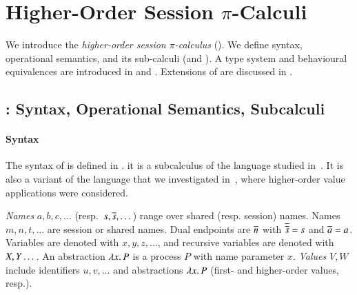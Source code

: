 \documentclass[runningheads]{llncs}
\begin{document}
%

\section{Higher-Order Session $\pi$-Calculi}
\label{sec:calculus}

We introduce 
the \emph{higher-order session $\pi$-calculus} (\HOp).
We define 
syntax, operational semantics, and 
its sub-calculi (\sessp and \HO).
A type system and behavioural equivalences are introduced in 
 and . 
Extensions of \HOp %
are discussed in .




\subsection{\HOp: Syntax, Operational Semantics, Subcalculi}
\label{subsec:syntax}

\paragraph{Syntax}
The syntax of \HOp is defined in .
\HOp it is a subcalculus of the language studied 
in~\cite{tlca07}. It is also a variant of the language that we investigated in~\cite{characteristic_bis}, 
where higher-order value applications were considered. 




\emph{Names} $a,b,c, \dots$ (resp.~$s, \overline{s}, \dots$) 
range over shared (resp. session) names. 
Names $m, n, t, \dots$ are session or shared names.
Dual endpoints are $\overline{n}$ with
$\overline{\overline{s}} = s$ and $\overline{a} = a$.
Variables are denoted with $x, y, z, \dots$, 
and recursive variables are denoted with $X, Y \dots$.
An abstraction %
$\lambda x.\,P$ is a process $P$ with name parameter $x$.
\emph{Values} $V,W$ include 
identifiers $u, v, \ldots$ %
and 
abstractions $\lambda x.\,P$ (first- and higher-order values, resp.). 
\end{document}
